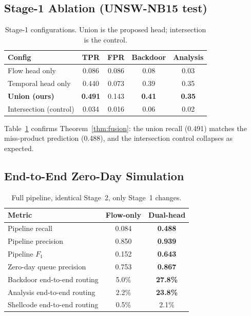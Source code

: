 \documentclass[journal]{IEEEtran}
\begin{document}
\subsection{Stage-1 Ablation (UNSW-NB15 test)}
\begin{table}[!t]
\caption{Stage-1 configurations. Union is the proposed head; intersection is
the control.}
\label{tab:ablation}
\centering
\begin{tabular}{lcccc}
\toprule
Config & TPR & FPR & Backdoor & Analysis \\
\midrule
Flow head only        & 0.086 & 0.086 & 0.08 & 0.03 \\
Temporal head only    & 0.440 & 0.073 & 0.39 & 0.35 \\
\textbf{Union (ours)} & \textbf{0.491} & 0.143 & \textbf{0.41} & \textbf{0.35} \\
Intersection (control)& 0.034 & 0.016 & 0.06 & 0.02 \\
\bottomrule
\end{tabular}
\end{table}

Table~\ref{tab:ablation} confirms Theorem~\ref{thm:fusion}: the union recall
(0.491) matches the miss-product prediction (0.488), and the intersection
control collapses as expected.

\subsection{End-to-End Zero-Day Simulation}
\begin{table}[!t]
\caption{Full pipeline, identical Stage~2, only Stage~1 changes.}
\label{tab:pipeline}
\centering
\begin{tabular}{lcc}
\toprule
Metric & Flow-only & Dual-head \\
\midrule
Pipeline recall     & 0.084 & \textbf{0.488} \\
Pipeline precision  & 0.850 & \textbf{0.939} \\
Pipeline $F_1$      & 0.152 & \textbf{0.643} \\
Zero-day queue precision & 0.753 & \textbf{0.867} \\
Backdoor end-to-end routing  & 5.0\% & \textbf{27.8\%} \\
Analysis end-to-end routing  & 2.2\% & \textbf{23.8\%} \\
Shellcode end-to-end routing & 0.5\% & 2.1\% \\
\bottomrule
\end{tabular}
\end{table}
\end{document}
